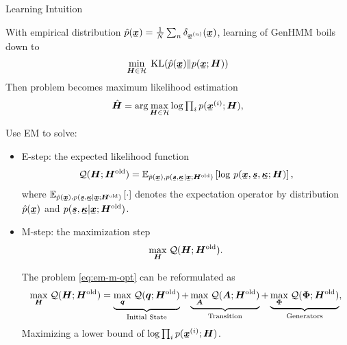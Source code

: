 \begin{frame}[label=current]{Learning Intuition}
  
  With empirical distribution $\hat{p}(\ubm{x}) = \frac{1}{N}\sum_{n}\delta_{\ubm{x}^{(n)}}(\ubm{x})$, learning of GenHMM boils down to
  \begin{equation*}
    \min_{\bm{H}\in \Hh}\;\mathrm{KL}(\hat{p}(\ubm{x})\|p(\ubm{x};\bm{H}))
  \end{equation*}
  Then problem becomes maximum likelihood estimation \\
  \begin{equation*}
    \hat{\bm{H}} =    \arg \max_{\bm{H} \in \Hh} \log \textstyle\prod_{i} p(\ubm{x}^{(i)};\bm{H}),
  \end{equation*}

  Use EM to solve:
  \begin{itemize}
  \item E-step: %
    the expected likelihood function
    \begin{equation*}\label{eq:em-q-funciton}
      \Qq(\bm{H}; \bm{H}^{\mathrm{old}}) = \EE_{\hat{p}(\ubm{x}),p(\ubm{s},\ubm{\kappa}| \ubm{x}; \bm{H}^{\mathrm{old}})}\left[ \log\,p(\ubm{x}, \ubm{s}, \ubm{\kappa}; \bm{H})\right],
    \end{equation*}
    where $\EE_{\hat{p}(\ubm{x}),p(\ubm{s},\ubm{\kappa}| \ubm{x}; \bm{H}^{\mathrm{old}})}\left[ \cdot\right]$ denotes the expectation operator by distribution $\hat{p}(\ubm{x})$ and $p(\ubm{s},\ubm{\kappa}| \ubm{x}; \bm{H}^{\mathrm{old}})$.

  \item M-step: the maximization step
    \begin{equation*}\label{eq:em-m-opt}
      \underset{\bm{H}}{\max}\; \mathcal{Q}(\bm{H}; \bm{H}^{\mathrm{old}}).
    \end{equation*}

    The problem \eqref{eq:em-m-opt} can be reformulated as
    \begin{align}\label{eq:m-step-subs}
      \underset{\bm{H}}{\max}\; \mathcal{Q}(\bm{H}; \bm{H}^{\mathrm{old}})
      =\underbrace{\underset{\bm{q}}{\max}\;\mathcal{Q}(\bm{q}; \bm{H}^{\mathrm{old}})}_\text{Initial State}
      + \underbrace{\underset{\bm{A}}{\max}\;\mathcal{Q}(\bm{A}; \bm{H}^{\mathrm{old}})}_\text{Transition} 
      + \underbrace{\underset{\bm{\Phi}}{\max}\;\mathcal{Q}(\bm{\Phi}; \bm{H}^{\mathrm{old}})}_\text{Generators},
    \end{align}
    Maximizing a lower bound of $\log \textstyle\prod_{i} p(\ubm{x}^{(i)};\bm{H})$.


\end{itemize}
\end{frame}
